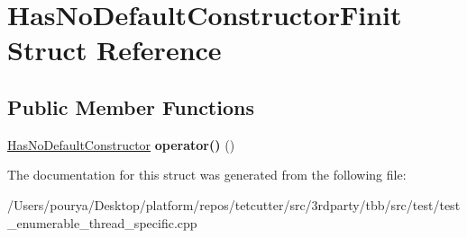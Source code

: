 \hypertarget{structHasNoDefaultConstructorFinit}{}\section{Has\+No\+Default\+Constructor\+Finit Struct Reference}
\label{structHasNoDefaultConstructorFinit}
\subsection*{Public Member Functions}
\begin{DoxyCompactItemize}
\item 
\hypertarget{structHasNoDefaultConstructorFinit_a775236a9c5019f869dd31a2027a6a0d1}{}\hyperlink{classHasNoDefaultConstructor}{Has\+No\+Default\+Constructor} {\bfseries operator()} ()\label{structHasNoDefaultConstructorFinit_a775236a9c5019f869dd31a2027a6a0d1}

\end{DoxyCompactItemize}


The documentation for this struct was generated from the following file\+:\begin{DoxyCompactItemize}
\item 
/\+Users/pourya/\+Desktop/platform/repos/tetcutter/src/3rdparty/tbb/src/test/test\+\_\+enumerable\+\_\+thread\+\_\+specific.\+cpp\end{DoxyCompactItemize}
